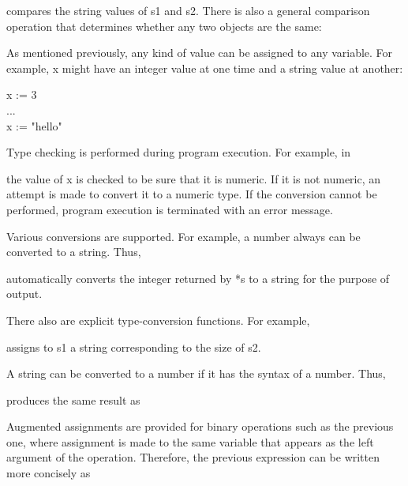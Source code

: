 
\noindent compares the string values of s1 and s2. There is also a
general comparison operation that determines whether any two objects
are the same:


As mentioned previously, any kind of value can be assigned to any
variable. For example, x might have an integer value at one time and a
string value at another:

\begin{iconcode}
\>x := 3 \\
\>... \\
\>x := "hello"
\end{iconcode}

Type checking is performed during program execution. For example, in


\noindent
the value of x is checked to be sure that it is numeric. If it is not
numeric, an attempt is made to convert it to a numeric type. If the
conversion cannot be performed, program execution is terminated with
an error message.

Various conversions are supported. For example, a number always can be
converted to a string. Thus,


\noindent automatically converts the integer returned by *s to a
string for the purpose of output.

There also are explicit type-conversion functions. For example,


\noindent assigns to s1 a string corresponding to the size of s2.

A string can be converted to a number if it has the syntax of a number. Thus,


\noindent produces the same result as


%
Augmented assignments are provided for binary operations such as the
previous one, where assignment is made to the same variable that
appears as the left argument of the operation. Therefore, the previous
expression can be written more concisely as


